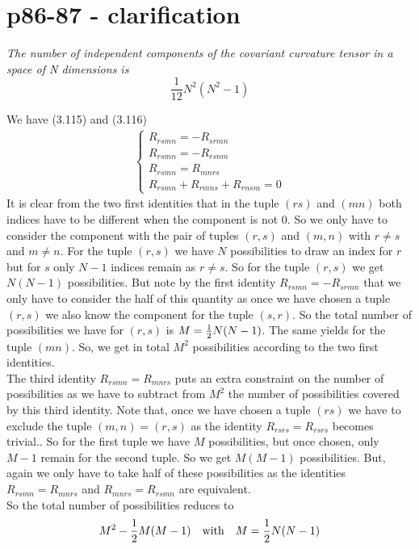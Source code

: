\section{p86-87 - clarification}
\begin{tcolorbox}
\textit{The number of independent components of the covariant curvature tensor in a space of N dimensions is} $$\frac{1}{12}N^2\left(N^2-1\right)$$
\end{tcolorbox}
We have (3.115) and (3.116)
\begin{align}
\left \{ \begin{array}{l}
R_{rsmn} =  - R_{srmn}\\
R_{rsmn} =  - R_{rsnm}\\
R_{rsmn} =   R_{mnrs}\\
R_{rsmn} + R_{rmns}+R_{rnsm}=0
\end{array}\right.
\end{align}
It is clear from the two first identities that  in the tuple $(rs)$ and $(mn)$ both indices have to be different when the component is not $0$. So we only have to consider the component with the pair of tuples $(r,s)$ and $(m,n)$ with $r \neq s$ and $m \neq n$.
For the tuple $(r,s)$ we have $N$ possibilities to draw an index for $r$ but for $s$ only $N-1$ indices remain as $r \neq s$. So for the tuple $(r,s)$ we get $N(N-1)$ possibilities. But note by the first identity $R_{rsmn} =  - R_{srmn}$ that we only have to consider the half of this quantity as once we have chosen a tuple $(r,s)$ we also know  the component for the tuple $(s,r)$. So the total number of possibilities we have for  $(r,s)$ is $M = \frac{1}{2} N(N-1)$. The same yields for the tuple $(mn)$. So, we get in total $M^2$ possibilities according to the two first identities.\\
The third identity $R_{rsmn} =   R_{mnrs}$ puts an extra constraint on the number of possibilities as we have to subtract from $M^2$ the number of possibilities covered by this third identity. Note that, once we have chosen a tuple $(rs)$ we have to exclude the tuple $(m,n) =  (r,s)$ as the identity $R_{rsrs} =   R_{rsrs}$ becomes trivial.. So for the first tuple we have $M$ possibilities, but once chosen, only $M-1$ remain for the second tuple. So we get $M(M-1)$ possibilities. But, again we only have to take half of these possibilities as the identities $R_{rsmn} =   R_{mnrs}$ and $ R_{mnrs} = R_{rsmn}$ are equivalent.\\
So the total number of possibilities reduces to $$ M^2 - \frac{1}{2} M(M-1) \quad \text{with} \quad M=\frac{1}{2} N(N-1) $$
